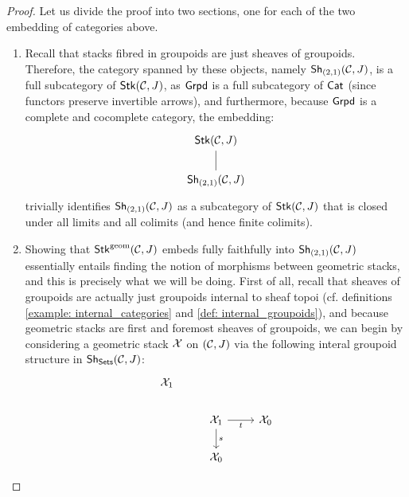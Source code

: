                         \begin{proof}
                            Let us divide the proof into two sections, one for each of the two embedding of categories above.
                            \begin{enumerate}
                                \item Recall that stacks fibred in groupoids are just sheaves of groupoids. Therefore, the category spanned by these objects, namely $\Sh_{(2,1)}(\C, J)$, is a full subcategory of $\Stk(\C, J)$, as $\Grpd$ is a full subcategory of $\Cat$ (since functors preserve invertible arrows), and furthermore, because $\Grpd$ is a complete and cocomplete category, the embedding:
                                    $$
                                        \begin{tikzcd}
                                        	{\Stk(\C, J)} \\
                                        	{\Sh_{(2,1)}(\C, J)}
                                        	\arrow[no head, from=2-1, to=1-1]
                                        \end{tikzcd}
                                    $$
                                trivially identifies $\Sh_{(2,1)}(\C, J)$ as a subcategory of $\Stk(\C, J)$ that is closed under all limits and all colimits (and hence finite colimits). 
                                \item Showing that $\Stk^{\geom}(\C, J)$ embeds fully faithfully into $\Sh_{(2,1)}(\C, J)$ essentially entails finding the  notion of morphisms between geometric stacks, and this is precisely what we will be doing. First of all, recall that sheaves of groupoids are actually just groupoids internal to sheaf topoi (cf. definitions \ref{example: internal_categories} and \ref{def: internal_groupoids}), and because geometric stacks are first and foremost sheaves of groupoids, we can begin by considering a geometric stack $\calX$ on $(\C, J)$ via the following interal groupoid structure in $\Sh_{\Sets}(\C, J)$:
                                    $$
                                        \begin{tikzcd}
                                        	{\calX_1} \\
                                        	& {\calX_1} & {\calX_0} \\
                                        	& {\calX_0}
                                        	\arrow["s", from=2-2, to=3-2]
                                        	\arrow["t"', from=2-2, to=2-3]

\end{tikzcd}$$
\end{enumerate}
\end{proof}
